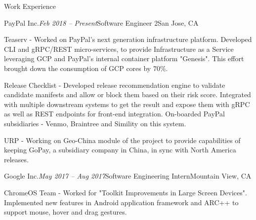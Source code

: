 \documentclass{resume} %
\begin{document}

\begin{rSection}{Work Experience}


\begin{rSubsection}{PayPal Inc.}{\emph{Feb 2018 -- Present}}{Software Engineer 2}{San Jose, CA}
\item Teaserv - Worked on PayPal's next generation infrastructure platform. Developed CLI and gRPC/REST micro-services, to provide Infrastructure as a Service leveraging GCP and PayPal's internal container
platform "Genesis". This effort brought down the consumption of GCP cores by 70\%.

\item Release Checklist - Developed release recommendation engine to validate candidate manifests and allow or block them based on their risk score.
Integrated with multiple downstream systems to get the result and expose them with gRPC as well as REST endpoints for front-end integration. On-boarded PayPal subsidiaries - Venmo, Braintree and Simility on this system.

\item URP - Working on Geo-China module of the project to provide capabilities of keeping GoPay, a subsidiary company in China, in sync with North America releases.

\end{rSubsection}


\begin{rSubsection}{Google Inc.}{\emph{May 2017 -- Aug 2017}}{Software Engineering Intern}{Mountain View, CA}
\item ChromeOS Team - Worked for "Toolkit Improvements in Large Screen Devices". Implemented new features in Android application framework and ARC++ to support mouse, hover and drag gestures.
\end{rSubsection}



\end{rSection}
\end{document}
